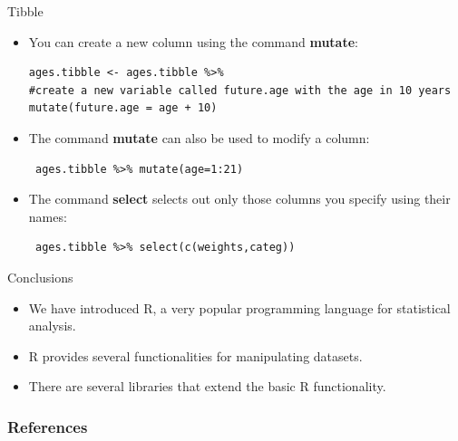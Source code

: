\documentclass[handout]{beamer}
\begin{document}
\begin{frame}[fragile]{Tibble}
\scriptsize{
\begin{itemize}
\item You can create a new column using the command \textbf{mutate}:
 \begin{verbatim} 
ages.tibble <- ages.tibble %>%
#create a new variable called future.age with the age in 10 years
mutate(future.age = age + 10) 
 \end{verbatim}
 
\item The command \textbf{mutate} can also be used to modify a column:
\begin{verbatim}
 ages.tibble %>% mutate(age=1:21)
\end{verbatim}

\item The command \textbf{select} selects out only those columns you specify using their names:
\begin{verbatim}
 ages.tibble %>% select(c(weights,categ))
\end{verbatim}


\end{itemize}



}
\end{frame}

\begin{frame}[fragile]{Conclusions}
\scriptsize{
\begin{itemize}
\item We have introduced R, a very popular programming language for statistical analysis.
\item R provides several functionalities for manipulating datasets.
\item There are several libraries that extend the basic R functionality.
\end{itemize}



}
\end{frame}



\begin{frame}[allowframebreaks]\scriptsize
\frametitle{References}


%
\end{frame}  






\end{document}
